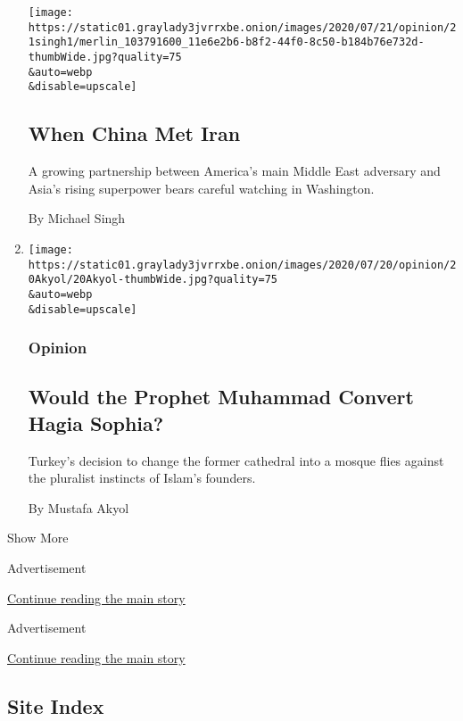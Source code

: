 \begin{enumerate}
  \texttt{[image: https://static01.graylady3jvrrxbe.onion/images/2020/07/21/opinion/21singh1/merlin\_103791600\_11e6e2b6-b8f2-44f0-8c50-b184b76e732d-thumbWide.jpg?quality=75\\\&auto=webp\\\&disable=upscale]}

  \hypertarget{when-china-met-iran}{%
  \subsection{When China Met Iran}\label{when-china-met-iran}}

  A growing partnership between America's main Middle East adversary and
  Asia's rising superpower bears careful watching in Washington.

  By Michael Singh
\item
  \href{/2020/07/20/opinion/hagia-sophia-mosque.html}{}

  \texttt{[image: https://static01.graylady3jvrrxbe.onion/images/2020/07/20/opinion/20Akyol/20Akyol-thumbWide.jpg?quality=75\\\&auto=webp\\\&disable=upscale]}

  \hypertarget{opinion-1}{%
  \subsubsection{Opinion}\label{opinion-1}}

  \hypertarget{would-the-prophet-muhammad-convert-hagia-sophia}{%
  \subsection{Would the Prophet Muhammad Convert Hagia
  Sophia?}\label{would-the-prophet-muhammad-convert-hagia-sophia}}

  Turkey's decision to change the former cathedral into a mosque flies
  against the pluralist instincts of Islam's founders.

  By Mustafa Akyol
\end{enumerate}

Show More

Advertisement

\protect\hyperlink{after-mid1}{Continue reading the main story}

Advertisement

\protect\hyperlink{after-mktg}{Continue reading the main story}

\hypertarget{site-index}{%
\subsection{Site Index}\label{site-index}}


